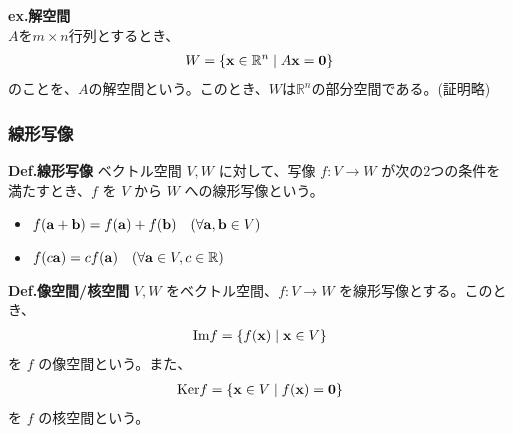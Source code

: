 \documentclass[a4paper,11pt]{jsarticle}
\numberwithin{equation}{section}
\begin{document}
\textbf{ex.解空間}\\
$A$を$m \times n $行列とするとき、
\begin{align}
  W = \left\{ \vb{x} \in \mathbb{R}^n \mid A\vb{x} = \vb{0} \right\}
\end{align}
のことを、$A$の解空間という。このとき、$W$は$\mathbb{R}^n$の部分空間である。(証明略)\\

\subsubsection{線形写像}
\begin{itembox}[l]{\textbf{Def.線形写像}}
  ベクトル空間 $V, W$ に対して、写像 $f: V \rightarrow W$ が次の2つの条件を満たすとき、$f$ を $V$ から $W$ への線形写像という。
  \begin{itemize}
    \item $f(\vb{a} + \vb{b}) = f(\vb{a}) + f(\vb{b}) \quad  (\forall \vb{a}, \vb{b} \in V)$
    \item $f(c\vb{a}) = cf(\vb{a}) \quad (\forall \vb{a} \in V, c \in \mathbb{R})$
  \end{itemize}
\end{itembox}

\begin{itembox}[l]{\textbf{Def.像空間/核空間}}
  $V, W$ をベクトル空間、$f: V \rightarrow W$ を線形写像とする。このとき、
  \begin{align}
    \text{Im}f = \left\{ f(\vb{x}) \mid \vb{x} \in V \right\}
  \end{align}
  を $f$ の像空間という。また、
  \begin{align}
    \text{Ker}f = \left\{ \vb{x} \in V \mid f(\vb{x}) = \vb{0} \right\}
  \end{align}
  を $f$ の核空間という。
\end{itembox}
\end{document}
